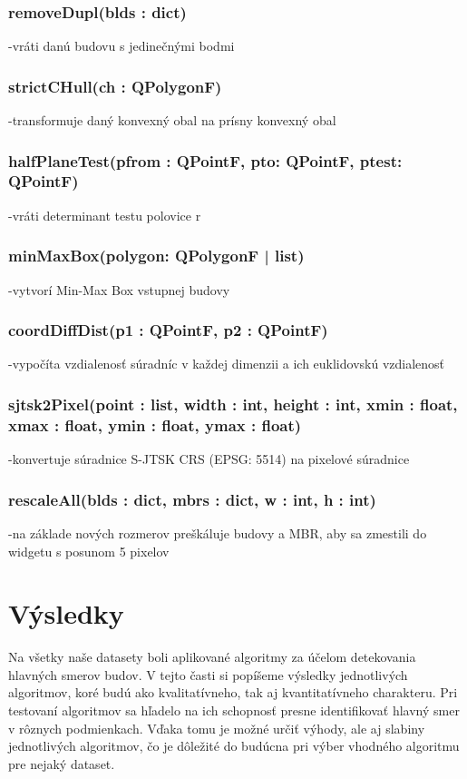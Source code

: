 \documentclass[12pt]{article}
\begin{document}
\subsubsection*{removeDupl(blds : dict)}
\noindent-vráti danú budovu s jedinečnými bodmi
\subsubsection*{strictC\textunderscore Hull(ch : QPolygonF)}
\noindent-transformuje daný konvexný obal na prísny konvexný obal
\subsubsection*{halfPlaneTest(p\textunderscore from : QPointF, p\textunderscore to: QPointF, p\textunderscore test: QPointF)}
\noindent-vráti determinant testu polovice r

\subsubsection*{minMaxBox(polygon: QPolygonF | list)}
\noindent-vytvorí Min-Max Box vstupnej budovy
\subsubsection*{coordDiffDist(p1 : QPointF, p2 : QPointF)}
\noindent-vypočíta vzdialenosť súradníc v každej dimenzii a ich euklidovskú vzdialenosť
\subsubsection*{sjtsk2Pixel(point : list, width : int, height : int, x\textunderscore min : float, x\textunderscore max : float, y\textunderscore min : float, y\textunderscore max : float)}
\noindent-konvertuje súradnice S-JTSK CRS (EPSG: 5514) na pixelové súradnice
\subsubsection*{rescaleAll(blds : dict, mbrs : dict, w : int, h : int)}
\noindent-na základe nových rozmerov preškáluje budovy a MBR, aby sa zmestili do widgetu s  posunom 5 pixelov
\newpage
\section*{Výsledky}
Na všetky naše datasety boli aplikované algoritmy za účelom detekovania hlavných smerov budov. V tejto časti si popíšeme výsledky jednotlivých algoritmov, koré budú ako kvalitatívneho, tak aj kvantitatívneho charakteru. Pri testovaní algoritmov sa hľadelo na ich schopnosť presne identifikovať hlavný smer v rôznych podmienkach. Vďaka tomu je možné určiť výhody, ale aj slabiny jednotlivých algoritmov, čo je dôležité do budúcna pri výber vhodného algoritmu pre nejaký dataset.
\end{document}
